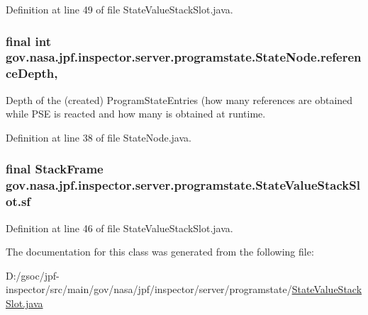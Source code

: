 Definition at line 49 of file State\+Value\+Stack\+Slot.\+java.

\subsubsection[{\texorpdfstring{reference\+Depth}{referenceDepth}}]{\setlength{\rightskip}{0pt plus 5cm}final int gov.\+nasa.\+jpf.\+inspector.\+server.\+programstate.\+State\+Node.\+reference\+Depth\hspace{0.3cm}{\ttfamily [protected]}, {\ttfamily [inherited]}}\hypertarget{classgov_1_1nasa_1_1jpf_1_1inspector_1_1server_1_1programstate_1_1_state_node_a55683618625dae46e8aa68d95811d6bb}{}\label{classgov_1_1nasa_1_1jpf_1_1inspector_1_1server_1_1programstate_1_1_state_node_a55683618625dae46e8aa68d95811d6bb}


Depth of the (created) Program\+State\+Entries (how many references are obtained while P\+SE is reacted and how many is obtained at runtime. 



Definition at line 38 of file State\+Node.\+java.

\subsubsection[{\texorpdfstring{sf}{sf}}]{\setlength{\rightskip}{0pt plus 5cm}final Stack\+Frame gov.\+nasa.\+jpf.\+inspector.\+server.\+programstate.\+State\+Value\+Stack\+Slot.\+sf\hspace{0.3cm}{\ttfamily [private]}}\hypertarget{classgov_1_1nasa_1_1jpf_1_1inspector_1_1server_1_1programstate_1_1_state_value_stack_slot_afc660da35cfea1fff267b7b97be87321}{}\label{classgov_1_1nasa_1_1jpf_1_1inspector_1_1server_1_1programstate_1_1_state_value_stack_slot_afc660da35cfea1fff267b7b97be87321}


Definition at line 46 of file State\+Value\+Stack\+Slot.\+java.



The documentation for this class was generated from the following file\+:\begin{DoxyCompactItemize}
\item 
D\+:/gsoc/jpf-\/inspector/src/main/gov/nasa/jpf/inspector/server/programstate/\hyperlink{_state_value_stack_slot_8java}{State\+Value\+Stack\+Slot.\+java}\end{DoxyCompactItemize}

